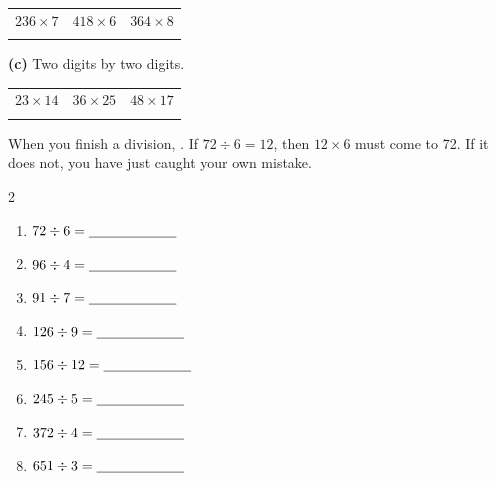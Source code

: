 \documentclass[12pt,a4paper]{article}
\begin{document}
\vspace{4pt}
\noindent
\begin{tabularx}{\textwidth}{|X|X|X|}
  \hline
  $236 \times 7$ & $418 \times 6$ & $364 \times 8$ \\
  \rule[-3.0em]{0pt}{3.8em} & & \\
  \hline
\end{tabularx}

\vspace{12pt}
\noindent\textbf{(c)} Two digits by two digits.

\vspace{4pt}
\noindent
\begin{tabularx}{\textwidth}{|X|X|X|}
  \hline
  $23 \times 14$ & $36 \times 25$ & $48 \times 17$ \\
  \rule[-3.6em]{0pt}{4.4em} & & \\
  \hline
\end{tabularx}



\begin{remember}
  When you finish a division, . If
  $72 \div 6 = 12$, then $12 \times 6$ must come to 72. If it does not, you have
  just caught your own mistake.
\end{remember}

\vspace{4pt}
\begin{multicols}{2}
\begin{enumerate}[label=(\alph*), itemsep=13pt]
  \item $72 \div 6 = \blank[2.2cm]$
  \item $96 \div 4 = \blank[2.2cm]$
  \item $91 \div 7 = \blank[2.2cm]$
  \item $126 \div 9 = \blank[2.2cm]$
  \item $156 \div 12 = \blank[2.2cm]$
  \item $245 \div 5 = \blank[2.2cm]$
  \item $372 \div 4 = \blank[2.2cm]$
  \item $651 \div 3 = \blank[2.2cm]$
\end{enumerate}
\end{multicols}
\end{document}
